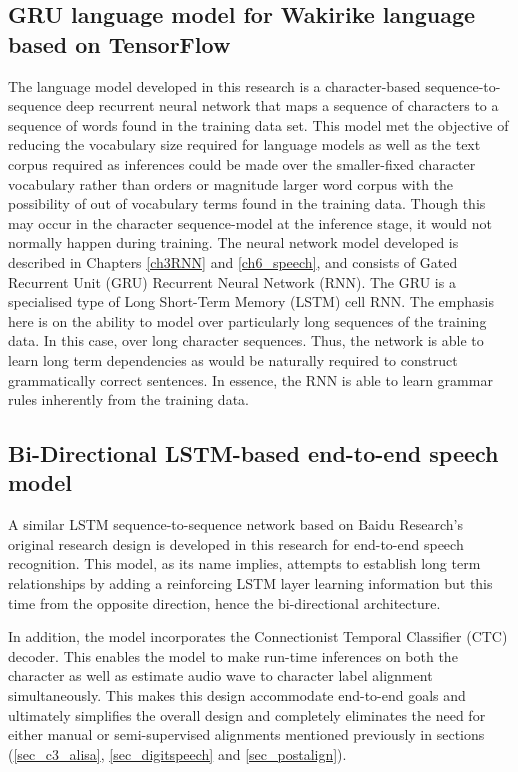 \subsection{GRU language model for Wakirike language based on TensorFlow}\label{sec_grulm}
The language model developed in this research is a character-based sequence-to-sequence deep recurrent neural network that maps a sequence of characters to a sequence of words found in the training data set. This model met the objective of reducing the vocabulary size required for language models as well as the text corpus required as inferences could be made over the smaller-fixed character vocabulary rather than orders or magnitude larger word corpus with the possibility of out of vocabulary terms found in the training data.  Though this may occur in the character sequence-model at the inference stage, it would not normally happen during training.  The neural network model developed is described in Chapters \ref{ch3RNN} and \ref{ch6_speech}, and consists of Gated Recurrent Unit (GRU) Recurrent Neural Network (RNN). The GRU is a specialised type of Long Short-Term Memory (LSTM) cell RNN.  The emphasis here is on the ability to model over particularly long sequences of the training data.  In this case, over long character sequences.  Thus, the network is able to learn long term dependencies as would be naturally required to construct grammatically correct sentences.  In essence, the RNN is able to learn grammar rules inherently from the training data.

\subsection{Bi-Directional LSTM-based end-to-end speech model}\label{sec_be2e}
A similar LSTM sequence-to-sequence network based on Baidu Research’s original research design \citep{hannun2014deep} is developed in this research for end-to-end speech recognition.  This model, as its name implies, attempts to establish long term relationships by adding a reinforcing LSTM layer learning information but this time from the opposite direction, hence the bi-directional architecture.  

In addition, the model incorporates the Connectionist Temporal Classifier (CTC) decoder. This enables the model to make run-time inferences on both the character as well as estimate audio wave to character label alignment simultaneously.  This makes this design accommodate end-to-end goals and ultimately simplifies the overall design and completely eliminates the need for either manual or semi-supervised alignments mentioned previously in sections (\ref{sec_c3_alisa}, \ref{sec_digitspeech} and \ref{sec_postalign}).

